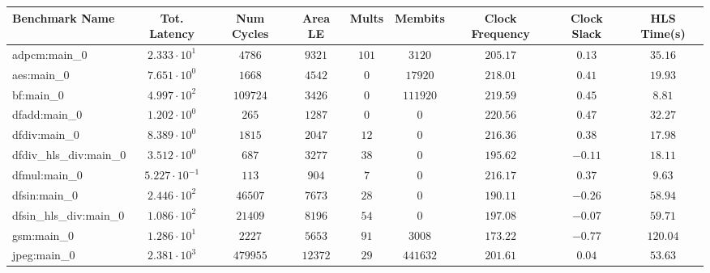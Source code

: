 \begin{tabular}{|l|c|c|c|c|c|c|c|c|}
\hline
Benchmark Name          & Tot. Latency            & Num Cycles & Area LE   & Mults   & Membits    & Clock Frequency & Clock Slack & HLS Time(s) \\
\hline
adpcm:main\_0           & $ 2.333 \cdot 10^{1}  $ & $ 4786   $ & $ 9321  $ & $ 101 $ & $ 3120   $ & $ 205.17      $ & $ 0.13    $ & $ 35.16   $ \\
aes:main\_0             & $ 7.651 \cdot 10^{0}  $ & $ 1668   $ & $ 4542  $ & $ 0   $ & $ 17920  $ & $ 218.01      $ & $ 0.41    $ & $ 19.93   $ \\
bf:main\_0              & $ 4.997 \cdot 10^{2}  $ & $ 109724 $ & $ 3426  $ & $ 0   $ & $ 111920 $ & $ 219.59      $ & $ 0.45    $ & $ 8.81    $ \\
dfadd:main\_0           & $ 1.202 \cdot 10^{0}  $ & $ 265    $ & $ 1287  $ & $ 0   $ & $ 0      $ & $ 220.56      $ & $ 0.47    $ & $ 32.27   $ \\
dfdiv:main\_0           & $ 8.389 \cdot 10^{0}  $ & $ 1815   $ & $ 2047  $ & $ 12  $ & $ 0      $ & $ 216.36      $ & $ 0.38    $ & $ 17.98   $ \\
dfdiv\_hls\_div:main\_0 & $ 3.512 \cdot 10^{0}  $ & $ 687    $ & $ 3277  $ & $ 38  $ & $ 0      $ & $ 195.62      $ & $ -0.11   $ & $ 18.11   $ \\
dfmul:main\_0           & $ 5.227 \cdot 10^{-1} $ & $ 113    $ & $ 904   $ & $ 7   $ & $ 0      $ & $ 216.17      $ & $ 0.37    $ & $ 9.63    $ \\
dfsin:main\_0           & $ 2.446 \cdot 10^{2}  $ & $ 46507  $ & $ 7673  $ & $ 28  $ & $ 0      $ & $ 190.11      $ & $ -0.26   $ & $ 58.94   $ \\
dfsin\_hls\_div:main\_0 & $ 1.086 \cdot 10^{2}  $ & $ 21409  $ & $ 8196  $ & $ 54  $ & $ 0      $ & $ 197.08      $ & $ -0.07   $ & $ 59.71   $ \\
gsm:main\_0             & $ 1.286 \cdot 10^{1}  $ & $ 2227   $ & $ 5653  $ & $ 91  $ & $ 3008   $ & $ 173.22      $ & $ -0.77   $ & $ 120.04  $ \\
jpeg:main\_0            & $ 2.381 \cdot 10^{3}  $ & $ 479955 $ & $ 12372 $ & $ 29  $ & $ 441632 $ & $ 201.61      $ & $ 0.04    $ & $ 53.63   $ \\

\end{tabular}

